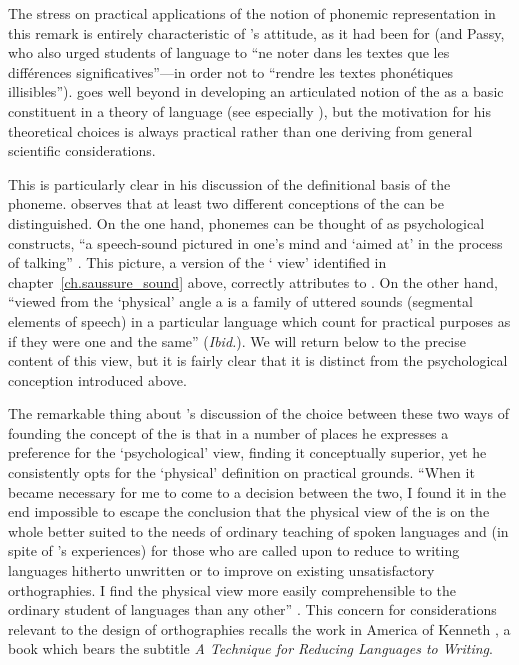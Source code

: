 The {stress} on practical applications of the notion of phonemic
representation in this remark is entirely characteristic of {\Jones}'s
attitude, as it had been for {\Sweet} (and Passy, who also urged students
of language to ``ne noter dans les textes que les différences
significatives''—in order not to ``rendre les textes phonétiques
illisibles''). {\Jones} goes well beyond {\Sweet} in developing an
articulated notion of the  as a basic constituent in a theory
of language (see especially \citealt{jones50:phoneme}), but the
motivation for his theoretical choices is always practical rather than
one deriving from general scientific considerations.

This is particularly clear in his discussion of the definitional basis
of the pho\-neme. {\Jones} observes that at least two different
conceptions of the  can be distinguished. On the one hand,
phonemes can be thought of as psychological constructs, ``a
speech-sound pictured in one's mind and `aimed at' in the process of
talking'' \citep[7]{jones57:meaning.of.phoneme}. This picture, a
version of the ` view' identified in
chapter~\ref{ch.saussure_sound} above, {\Jones} correctly attributes to
{\Baudouin}. On the other hand, ``viewed from the `physical' angle a
 is a family of uttered sounds (segmental elements of speech)
in a particular language which count for practical purposes as if they
were one and the same'' (\emph{Ibid.}). We will return below to the
precise content of this view, but it is fairly clear that it is
distinct from the psychological conception introduced above.

The remarkable thing about {\Jones}'s discussion of the choice between
these two ways of founding the {concept} of the  is that in a
number of places he expresses a preference for the `psychological'
view, finding it conceptually superior, yet he consistently opts for
the `physical' definition on practical grounds. ``When it became
necessary for me to come to a decision between the two, I found it in
the end impossible to escape the conclusion that the physical view of
the  is on the whole better suited to the needs of ordinary
teaching of spoken languages and (in spite of {\Sapir}'s experiences) for
those who are called upon to reduce to writing languages hitherto
unwritten or to improve on existing unsatisfactory orthographies. I
find the physical view more easily comprehensible to the ordinary
student of languages than any other''
\citep[9]{jones57:meaning.of.phoneme}. This concern for considerations
relevant to the design of orthographies recalls the work in America of
Kenneth \citet{pike47:phonemics}, a book which bears the subtitle
\textsl{A Technique for Reducing Languages to Writing}.

